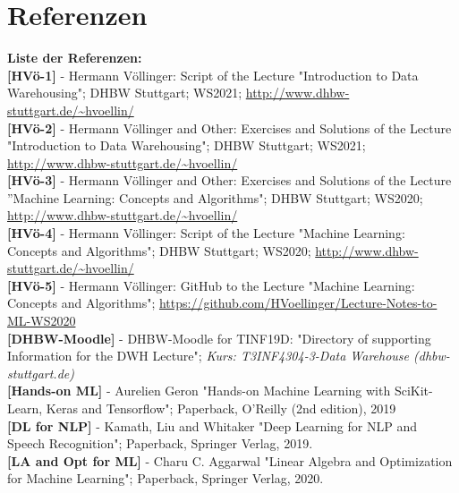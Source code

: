 \documentclass[12pt]{article}
\begin{document}
\newpage

\section{Referenzen}

\textbf{Liste der Referenzen:} \\

\textbf{[HVö-1]} - Hermann Völlinger: Script of the Lecture "Introduction to Data Warehousing"; DHBW Stuttgart; WS2021; \url{http://www.dhbw-stuttgart.de/~hvoellin/}\\ 

\textbf{[HVö-2]} - Hermann Völlinger and Other: Exercises and Solutions of the Lecture "Introduction to Data Warehousing"; DHBW Stuttgart; WS2021; \url{http://www.dhbw-stuttgart.de/~hvoellin/}\\

\textbf{[HVö-3]} - Hermann Völlinger and Other: Exercises and Solutions of the Lecture ”Machine Learning: Concepts and Algorithms"; DHBW Stuttgart; WS2020; \url{http://www.dhbw-stuttgart.de/~hvoellin/}\\

\textbf{[HVö-4]} - Hermann Völlinger: Script of the Lecture "Machine Learning: Concepts and Algorithms"; DHBW Stuttgart; WS2020; \url{http://www.dhbw-stuttgart.de/~hvoellin/}\\ 

\textbf{[HVö-5]} - Hermann Völlinger: GitHub to the Lecture "Machine Learning: Concepts and Algorithms"; \url{https://github.com/HVoellinger/Lecture-Notes-to-ML-WS2020}\\

\textbf{[DHBW-Moodle]} - DHBW-Moodle for TINF19D: "Directory of supporting Information for the DWH Lecture"; \textit{Kurs: T3INF4304-3-Data Warehouse (dhbw-stuttgart.de)}\\

\textbf{[Hands-on ML]} - Aurelien Geron "Hands-on Machine Learning with SciKit-Learn, Keras and Tensorflow"; Paperback, O'Reilly (2nd edition), 2019\\

\textbf{[DL for NLP]} - Kamath, Liu and Whitaker "Deep Learning for NLP and Speech Recognition"; Paperback, Springer Verlag, 2019.\\

\textbf{[LA and Opt for ML]} - Charu C. Aggarwal "Linear Algebra and Optimization for Machine Learning"; Paperback, Springer Verlag, 2020.\\
\end{document}
